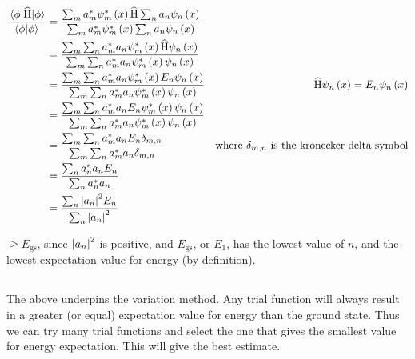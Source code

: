 \subsection{}
\begin{align*}
    \frac{\expectationvalue{\widehat{\operatorname{H}}}{\phi}}{\braket{\phi}} & = \frac{\sum_m a_m^* \psi_m^* \del{x} \widehat{\operatorname{H}} \sum_n a_n \psi_n \del{x}}{\sum_m a_m^* \psi_m^* \del{x} \sum_n a_n \psi_n \del{x}}\\
    & = \frac{\sum_m \sum_n a_m^* a_n \psi_m^* \del{x} \widehat{\operatorname{H}} \psi_n \del{x}}{\sum_m \sum_n a_m^* a_n \psi_m^* \del{x} \psi_n \del{x}}\\
    & = \frac{\sum_m \sum_n a_m^* a_n \psi_m^* \del{x} E_n \psi_n \del{x}}{\sum_m \sum_n a_m^* a_n \psi_m^* \del{x} \psi_n \del{x}} & \widehat{\operatorname{H}} \psi_n \del{x} = E_n \psi_n \del{x}\\
    & = \frac{\sum_m \sum_n a_m^* a_n E_n \psi_m^* \del{x} \psi_n \del{x}}{\sum_m \sum_n a_m^* a_n \psi_m^* \del{x} \psi_n \del{x}}\\
    & = \frac{\sum_m \sum_n a_m^* a_n E_n \delta_{m,n}}{\sum_m \sum_n a_m^* a_n \delta_{m,n}} & \textrm{where $ \delta_{m,n} $ is the kronecker delta symbol}\\
    & = \frac{\sum_n a_n^* a_n E_n}{\sum_n a_n^* a_n}\\
    & = \frac{\sum_n \abs{a_n}^2 E_n}{\sum_n \abs{a_n}^2}\\
\end{align*}

$ \geq E_{\textrm{gs}} $, since $ \abs{a_n}^2 $ is positive, and $ E_{\textrm{gs}} $, or $ E_1 $, has the lowest value of $ n $, and the lowest expectation value for energy (by definition).

\subsection{}
The above underpins the variation method. Any trial function will always result in a greater (or equal) expectation value for energy than the ground state. Thus we can try many trial functions and select the one that gives the smallest value for energy expectation. This will give the best estimate.

